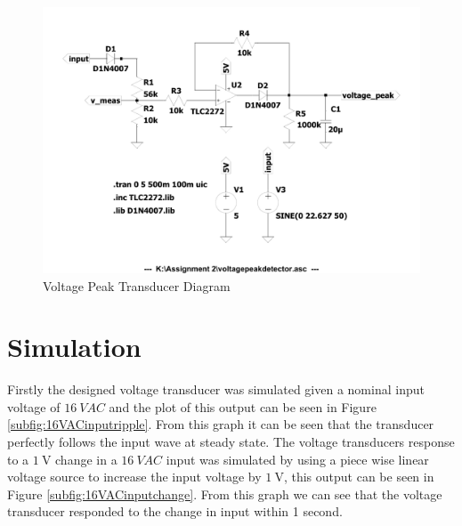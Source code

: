 \begin{figure}[h!]
    \centering
    \includegraphics[width = 0.65\linewidth]{Figures/voltagepeakdetector.pdf}
        \caption{Voltage Peak Transducer Diagram}
    \label{fig:voltagepeakdetector.pdf}
\end{figure}


\section{Simulation} \label{sec:simulation_voltage_peak_transducer}
Firstly the designed voltage transducer was simulated given a nominal input voltage of $\SI{16}{VAC}$ and the plot of this output can be seen in Figure \ref{subfig:16VACinputripple}. From this graph it can be seen that the transducer perfectly follows the input wave at steady state. The voltage transducers response to a $\SI{1}{\volt}$ change in a $\SI{16}{VAC}$ input was simulated by using a piece wise linear voltage source to increase the input voltage by $\SI{1}{\volt}$, this output can be seen in Figure \ref{subfig:16VACinputchange}. From this graph we can see that the voltage transducer responded to the change in input within 1 second.

